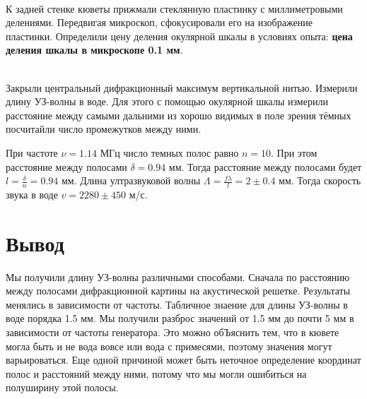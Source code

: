 \\\indent
К задней стенке кюветы прижмали стеклянную пластинку с миллиметровыми делениями. Передвигая
микроскоп, сфокусировали его на изображение пластинки.
Определили цену деления окулярной шкалы в условиях опыта: \textbf{цена деления шкалы в микроскопе 0.1 мм}.

\\\indent
Закрыли центральный дифракционный максимум вертикальной нитью. Измерили длину УЗ-волны в воде. Для этого с помощью окулярной шкалы измерили расстояние между самыми дальними из хорошо видимых в поле зрения тёмных посчитайли число промежутков между ними.

При частоте $\nu = 1.14$ МГц число темных полос равно $n = 10$. При этом расстояние между полосами $\delta = 0.94$ мм. Тогда расстояние между полосами будет $l = \frac{\delta}{n} = 0.94 $ мм. Длина ултразвуковой волны $\Lambda = \frac{f\lambda}{l} = 2 \pm 0.4$ мм. Тогда скорость звука в воде $v = 2280 \pm 450$ м/с.

\section*{Вывод}
Мы получили длину УЗ-волны различными способами. Сначала по расстоянию между полосами дифракционной картины на акустической решетке. Результаты менялись в зависимости от частоты. Табличное знаение для длины УЗ-волны в воде порядка 1.5 мм. Мы получили разброс значений от 1.5 мм до почти 5 мм в зависимости от частоты генератора. Это можно обЪяснить тем, что в кювете могла быть и не вода вовсе или вода с примесями, поэтому значения могут варьироваться. Еще одной причиной может быть неточное определение координат полос и расстояний между ними, потому что мы могли ошибиться на полуширину этой полосы.

